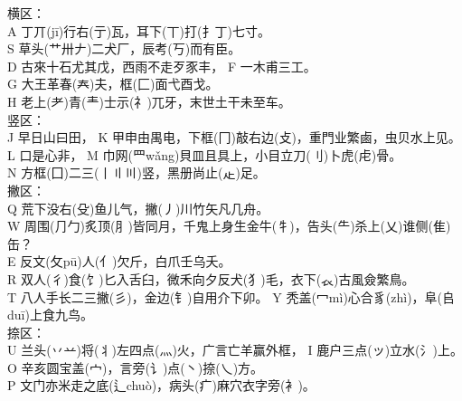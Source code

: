 \documentclass{ctexart}
\begin{document}
    \vspace{5mm}

        \fontsize{14pt}{14pt} \selectfont 

    \begin{multicols}{2}
    横区：\\
    A 丁丌(jī)行右(亍)瓦，耳下(丅)打(扌丁)七寸。\\
    S 草头(艹卅𠂇)二犬厂，辰考(丂)而有臣。\\
    D 古來十石尤其戊，西雨不走歹豕丰， F 一木甫三工。\\
    G 大王革春(𡗗)夫，框(匚)面弋酉戈。\\
    H 老上(耂)青(龶)士示(礻)兀牙，末世土干未至车。\\
    \vspace{12pt}
    竖区：\\
    J 早日山曰田， K 甲申由禺电，下框(冂)敲右边(攴)，重門业繁鹵，虫贝水上见。\\
    L 口是心非， M 巾网(罒wǎng)貝皿且具上，小目立刀(刂)卜虎(虍)骨。\\
    N 方框(囗)二三(丨〢〣)竖，黑册尚止(龰)足。\\
    
    撇区：\\
    Q 荒下没右(殳)鱼儿气，撇(丿)川竹矢凡几舟。 \\
    W 周围(⺆勹)炙顶(⺼)皆同月，千鬼上身生金牛(牜)，告头(⺧)杀上(乂)谁侧(隹)缶？\\
    E 反文(攵pū)人(亻)欠斤，白爪壬乌夭。\\
    R 双人(彳)食(饣)匕入舌臼，微禾向夕反犬(犭)毛，衣下(𧘇)古風僉繁鳥。\\
    T 八人手长二三撇(彡)，金边(钅)自用介下卯。 Y 秃盖(冖mì)心合豸(zhì)，阜(𠂤duī)上食九鸟。\\
    \vspace{12pt}
    捺区：\\
    U 兰头(丷䒑)将(丬)左四点(灬)火，广言亡羊赢外框， I 鹿户三点(ッ)立水(氵)上。\\
    O 辛亥圆宝盖(宀)，言旁(讠)点(丶)捺(乀)方。\\
    P 文门亦米走之底(辶chuò)，病头(疒)麻穴衣字旁(衤)。\\
        \end{multicols}
\end{document}
